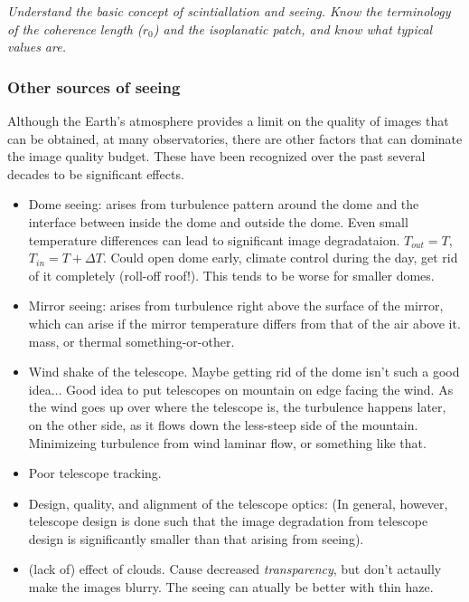 \documentclass[12pt]{article}
\newcommand{\mynotes}[1]{\textcolor{myBlue}{#1}}
\newcommand{\test}[1]{%
    \begin{center}
        {\parbox{0.9\textwidth}{\textit{\small#1}}}
    \end{center}}
\begin{document}
\test{Understand the basic concept of scintiallation and seeing. Know the
terminology of the coherence length ($r_{0}$) and the isoplanatic patch,
and know what typical values are.}

\subsubsection{Other sources of seeing}
Although the Earth's atmosphere provides a limit on the quality of
images that can be obtained, at many observatories, there are other
factors that can dominate the image quality budget. These have been
recognized over the past several decades to be significant effects.
\begin{itemize}
    \item Dome seeing: arises from turbulence pattern around the dome and the
        interface between inside the dome and outside the dome. Even small
        temperature differences can lead to significant image degradataion.
        \textcolor{myBlue}{$T_{out} = T$, $T_{in} = T + \Delta T$. Could open
        dome early, climate control during the day, get rid of it completely
        (roll-off roof!). This tends to be worse for smaller domes.}
    \item Mirror seeing: arises from turbulence right above the surface of the
        mirror, which can arise if the mirror temperature differs from that of
        the air above it. \textcolor{myBlue}{%
        mass, or thermal something-or-other}.
    \item Wind shake of the telescope. \mynotes{Maybe getting rid
        of the dome isn't such a good idea$\ldots$ Good idea to put
        telescopes on mountain on edge facing the wind. As the wind goes up
        over where the telescope is, the turbulence happens later, on the
        other side, as it flows down the less-steep side of the mountain.
        Minimizeing turbulence from wind laminar flow, or something like
        that.}
    \item Poor telescope tracking.
    \item Design, quality, and alignment of the telescope optics: (In general,
        however, telescope design is done such that the image degradation from
        telescope design is significantly smaller than that arising from
        seeing).
    \item (lack of) effect of clouds. \mynotes{Cause decreased
        \emph{transparency}, but don't actaully make the images blurry. The
        seeing can atually be better with thin haze.}
\end{itemize}
\end{document}
